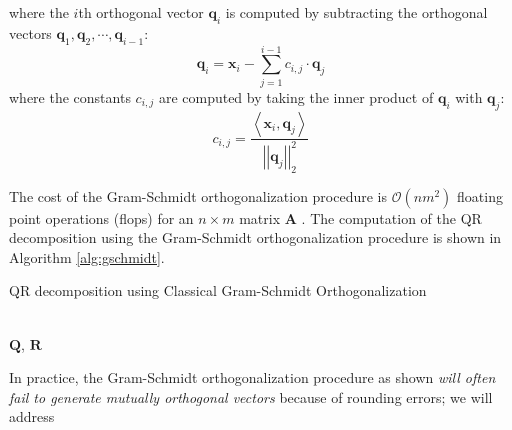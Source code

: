 \documentclass{article}[11pt]
\newcommand{\norm}[1]{\left|\left|#1\right|\right|}
\begin{document}
\begin{mdframed}
\begin{itemize}[leftmargin=16pt]
{   where the $i$th orthogonal vector $\mathbf{q}_{i}$ is computed by subtracting the orthogonal vectors $\mathbf{q}_{1},\mathbf{q}_{2},\cdots,\mathbf{q}_{i-1}$:
   \begin{equation*}
      \mathbf{q}_{i} = \mathbf{x}_{i} - \sum_{j=1}^{i-1}c_{i,j}\cdot\mathbf{q}_{j}
   \end{equation*}
   where the constants $c_{i,j}$ are computed by taking the inner product of $\mathbf{q}_{i}$ with $\mathbf{q}_{j}$:
   \begin{equation*}
      c_{i,j} = \frac{\left<\mathbf{x}_{i},\mathbf{q}_{j}\right>}{\norm{\mathbf{q}_{j}}_{2}^{2}}
   \end{equation*}}
\end{itemize}
\end{mdframed}
The cost of the Gram-Schmidt orthogonalization procedure is $\mathcal{O}(nm^{2})$ floating point operations (flops) for an $n\times{m}$ matrix $\mathbf{A}$ \cite{golub13}.
The computation of the QR decomposition using the Gram-Schmidt orthogonalization procedure is shown in Algorithm \ref{alg:gschmidt}.
\begin{algorithm}[H]
   \begin{algorithmic}[1]
   \caption{QR decomposition using Classical Gram-Schmidt Orthogonalization}\label{alg:gschmidt}
      \EndFor
      \State{$\mathbf{Q}_{j}\gets\mathbf{v}_{j}/\norm{\mathbf{v}_{j}}_{2}$}
   \EndFor
   \\
   \Return $\mathbf{Q}$, $\mathbf{R}$
   \end{algorithmic}
\end{algorithm}
In practice, the Gram-Schmidt orthogonalization procedure as shown \emph{will often fail to generate mutually orthogonal vectors} because of rounding errors; we will address
\end{document}

